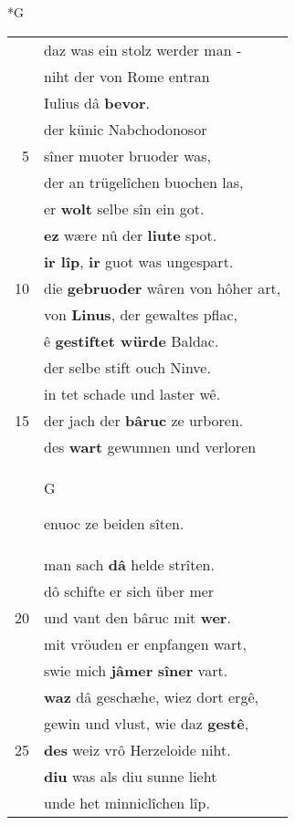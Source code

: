 \documentclass[8pt,a4paper,notitlepage]{article}
\begin{document}
\newpage
\begin{table}[ht]
\begin{minipage}[t]{0.5\linewidth}
\small
\begin{center}*G
\end{center}
\begin{tabular}{rl}
 & daz was ein stolz werder man -\\ 
 & niht der von Rome entran\\ 
 & Iulius dâ \textbf{bevor}.\\ 
 & der künic Nabchodonosor\\ 
5 & sîner muoter bruoder was,\\ 
 & der an trügelîchen buochen las,\\ 
 & er \textbf{wolt} selbe sîn ein got.\\ 
 & \textbf{ez} wære nû der \textbf{liute} spot.\\ 
 & \textbf{ir lîp}, \textbf{ir} guot was ungespart.\\ 
10 & die \textbf{gebruoder} wâren von hôher art,\\ 
 & von \textbf{Linus}, der gewaltes pflac,\\ 
 & ê \textbf{gestiftet würde} Baldac.\\ 
 & der selbe stift ouch Ninve.\\ 
 & in tet schade und laster wê.\\ 
15 & der jach der \textbf{bâruc} ze urboren.\\ 
 & des \textbf{wart} gewunnen und verloren\\ 
 & \begin{large}G\end{large}enuoc ze beiden sîten.\\ 
 & man sach \textbf{dâ} helde strîten.\\ 
 & dô schifte er sich über mer\\ 
20 & und vant den bâruc mit \textbf{wer}.\\ 
 & mit vröuden er enpfangen wart,\\ 
 & swie mich \textbf{jâmer} \textbf{sîner} vart.\\ 
 & \textbf{waz} dâ geschæhe, wiez dort ergê,\\ 
 & gewin und vlust, wie daz \textbf{gestê},\\ 
25 & \textbf{des} weiz vrô Herzeloide niht.\\ 
 & \textbf{diu} was als diu sunne lieht\\ 
 & unde het minniclîchen lîp.\\ 

\end{tabular}
\end{minipage}
\end{table}
\end{document}
